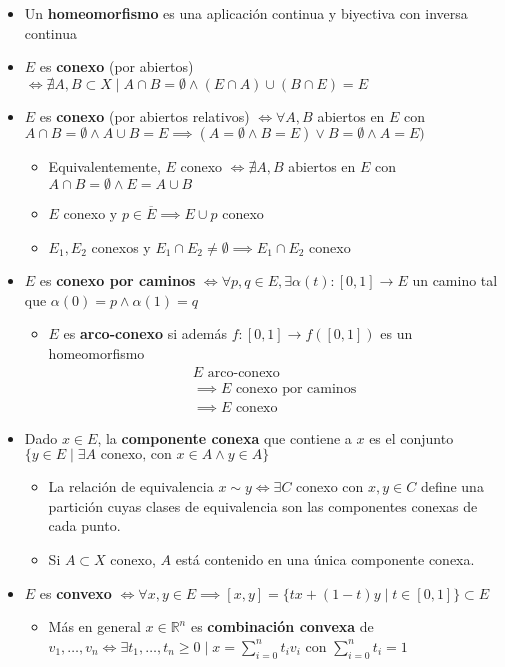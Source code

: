 \documentclass[a4paper,twocolumn]{extarticle}
\newcommand{\R}{\mathbb{R}}
\begin{document}
\begin{itemize}
	\item Un \textbf{homeomorfismo} es una aplicación continua y biyectiva con inversa continua
	\item $E$ es \textbf{conexo} (por abiertos) $\iff \nexists A, B \subset X \mid A \cap B = \emptyset \land (E \cap A) \cup (B \cap E) = E$
	\item $E$ es \textbf{conexo} (por abiertos relativos) $\iff \forall A,B$ abiertos en $E$ con $A \cap B = \emptyset \land A \cup B = E \implies (A = \emptyset \land B = E) \lor B = \emptyset \land A = E)$
	\begin{itemize}
		\item Equivalentemente, $E$ conexo $\iff \nexists A,B$ abiertos en $E$ con $A\cap B = \emptyset \land E = A \cup B$
		\item $E$ conexo y $p \in \overline{E} \implies E \cup p$ conexo
		\item $E_1, E_2$ conexos y $E_1 \cap E_2 \neq \emptyset \implies E_1 \cap E_2$ conexo
	\end{itemize}
	\item $E$ es \textbf{conexo por caminos} $\iff \forall p,q \in E, \exists \alpha(t):[0,1] \to E$ un camino tal que $\alpha(0) = p \land \alpha(1) = q$
	\begin{itemize}
		\item $E$ es \textbf{arco-conexo} si además $f:[0,1] \to f([0,1])$ es un homeomorfismo
		\begin{multline*}
			E \text{ arco-conexo } \\\implies E \text{ conexo por caminos }\\ \implies E \text{ conexo }
		\end{multline*}
	\end{itemize}
	\item Dado $x \in E$, la \textbf{componente conexa} que contiene a $x$ es el conjunto $\{y \in E \mid \exists A \text{ conexo, con } x \in A \land y \in A\}$
	\begin{itemize}
		\item La relación de equivalencia $x\sim y \iff \exists C$ conexo con $x,y \in C$ define una partición cuyas clases de equivalencia son las componentes conexas de cada punto.
		\item Si $A \subset X$ conexo, $A$ está contenido en una única componente conexa.
	\end{itemize}
	\item $E$ es \textbf{convexo} $\iff \forall x, y \in E \implies [x,y] = \{tx + (1-t)y \mid t \in [0,1]\} \subset E$
	\begin{itemize}
		\item Más en general $x \in \R^n$ es \textbf{combinación convexa} de $v_1, \dots, v_n \iff \exists t_1, \dots, t_n \geq 0 \mid x = \sum_{i=0}^n t_iv_i$ con $\sum_{i=0}^n t_i = 1$
	\end{itemize}
\end{itemize}
\end{document}
